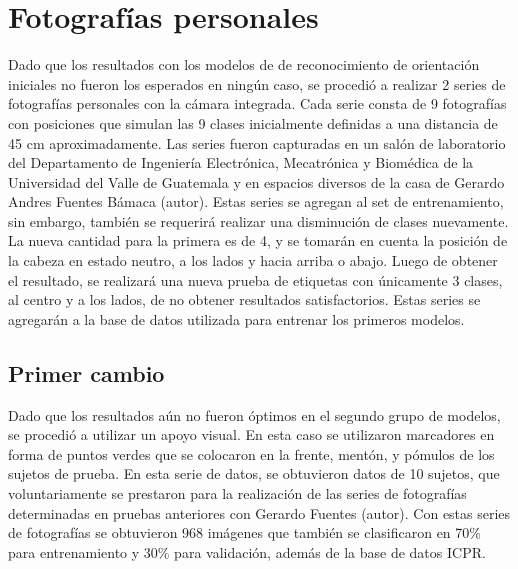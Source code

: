 \section{Fotografías personales}

Dado que los resultados con los modelos de de reconocimiento de orientación iniciales no fueron los esperados en ningún caso, se procedió a realizar 2 series de fotografías personales con la cámara integrada. Cada serie consta de 9 fotografías con posiciones que simulan las 9 clases inicialmente definidas a una distancia de 45 cm aproximadamente. Las series fueron capturadas en un salón de laboratorio del Departamento de Ingeniería Electrónica, Mecatrónica y Biomédica de la Universidad del Valle de Guatemala y en espacios diversos de la casa de Gerardo Andres Fuentes Bámaca (autor). Estas series se agregan al set de entrenamiento, sin embargo, también se requerirá realizar una disminución de clases nuevamente. La nueva cantidad para la primera es de 4, y se tomarán en cuenta la posición de la cabeza en estado neutro, a los lados y hacia arriba o abajo. Luego de obtener el resultado, se realizará una nueva prueba de etiquetas con únicamente 3 clases, al centro y a los lados, de no obtener resultados satisfactorios. Estas series se agregarán a la base de datos utilizada para entrenar los primeros modelos.

\subsection{Primer cambio}

Dado que los resultados aún no fueron óptimos en el segundo grupo de modelos, se procedió a utilizar un apoyo visual. En esta caso se utilizaron marcadores en forma de puntos verdes que se colocaron en la frente, mentón, y pómulos de los sujetos de prueba. En esta serie de datos, se obtuvieron datos de 10 sujetos, que voluntariamente se prestaron para la realización de las series de fotografías determinadas en pruebas anteriores con Gerardo Fuentes (autor). Con estas series de fotografías se obtuvieron 968 imágenes que también se clasificaron en 70\% para entrenamiento y 30\% para validación, además de la base de datos ICPR.